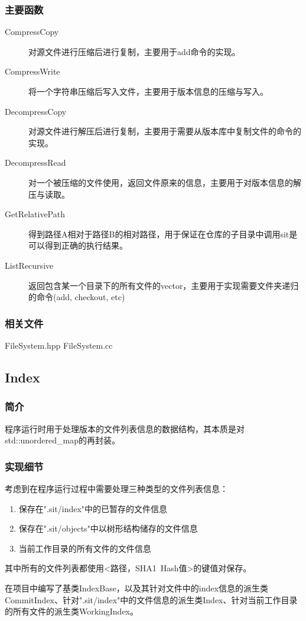 \documentclass[11pt, a4paper, UTF8]{ctexart}
\begin{document}
\subsubsection{主要函数}
\begin{description}
	\item[CompressCopy] 对源文件进行压缩后进行复制，主要用于add命令的实现。
	\item[CompressWrite] 将一个字符串压缩后写入文件，主要用于版本信息的压缩与写入。
	\item[DecompressCopy] 对源文件进行解压后进行复制，主要用于需要从版本库中复制文件的命令的实现。
	\item[DecompressRead] 对一个被压缩的文件使用，返回文件原来的信息，主要用于对版本信息的解压与读取。
	\item[GetRelativePath] 得到路径A相对于路径B的相对路径，用于保证在仓库的子目录中调用sit是可以得到正确的执行结果。
	\item[ListRecursive] 返回包含某一个目录下的所有文件的vector，主要用于实现需要文件夹递归的命令(add, checkout, etc)
\end{description}
\subsubsection{相关文件}
FileSystem.hpp FileSystem.cc

\subsection{Index}
\subsubsection{简介}
程序运行时用于处理版本的文件列表信息的数据结构，其本质是对std::unordered\_map的再封装。
\subsubsection{实现细节}
考虑到在程序运行过程中需要处理三种类型的文件列表信息：
\begin{enumerate}
	\item 保存在".sit/index"中的已暂存的文件信息
	\item 保存在".sit/objects"中以树形结构储存的文件信息
	\item 当前工作目录的所有文件的文件信息
\end{enumerate}
其中所有的文件列表都使用<路径，SHA1~Hash值>的键值对保存。

在项目中编写了基类IndexBase，以及其针对文件中的index信息的派生类CommitIndex、针对".sit/index"中的文件信息的派生类Index、针对当前工作目录的所有文件的派生类WorkingIndex。
\end{document}
